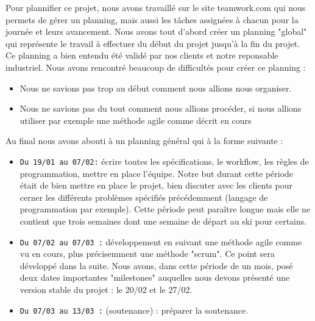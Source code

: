 Pour plannifier ce projet, nous avons travaillé sur le site teamwork.com qui nous permets de gérer un planning, mais aussi
les tâches assignées à chacun pour la journée et leurs avancement. Nous avons tout d'abord créer un planning "global" qui
représente le travail à effectuer du début du projet jusqu'à la fin du projet. Ce planning a bien entendu été 
validé par nos clients et notre reponsable industriel. Nous avons rencontré beaucoup de difficultés pour créer
ce planning : \\
\begin{itemize}
\item Nous ne savions pas trop au début comment nous allions nous organiser. \\
\item Nous ne savions pas du tout comment nous allions procéder, si nous allions utiliser par exemple une méthode agile comme décrit en cours \\
\end{itemize}

Au final nous avons abouti à un planning général qui à la forme suivante :\\
\begin{itemize}
\item \texttt{Du 19/01 au 07/02:} écrire toutes les spécifications, le workflow, les règles de programmation, mettre en place l'équipe. Notre
but durant cette période était de bien mettre en place le projet, bien discuter avec les clients pour cerner les différents 
problèmes spécifiés précédemment (langage de programmation par exemple). Cette période peut paraître longue mais elle
ne contient que trois semaines dont une semaine de départ au ski pour certains. \\
\item \texttt{Du 07/02 au 07/03 :} développement en suivant une méthode agile comme vu en cours, plus précisemment une méthode
"scrum". Ce point sera développé dans la suite. Nous avons, dans cette période de un mois, posé deux dates importantes
"milestones" auquelles nous devons présenté une version stable du projet : le 20/02 et le 27/02.\\
\item \texttt{Du 07/03 au 13/03 :} (soutenance) : préparer la soutenance.\\
\end{itemize}




